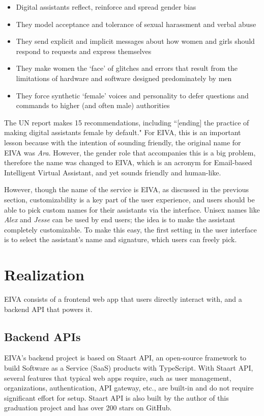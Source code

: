 \documentclass{article}
\begin{document}
\begin{itemize}
	\item Digital assistants reflect, reinforce and spread gender bias
	\item They model acceptance and tolerance of sexual harassment and verbal abuse
	\item They send explicit and implicit messages about how women and girls should respond to requests and express themselves
	\item They make women the ‘face’ of glitches and errors that result from the limitations of hardware and software designed predominately by men
	\item They force synthetic ‘female’ voices and personality to defer questions and commands to higher (and often male) authorities
\end{itemize}

The UN report makes 15 recommendations, including ``[ending] the practice of making digital assistants female by default." For EIVA, this is an important lesson because with the intention of sounding friendly, the original name for EIVA was \emph{Ara}. However, the gender role that accompanies this is a big problem, therefore the name was changed to EIVA, which is an acronym for Email-based Intelligent Virtual Assistant, and yet sounds friendly and human-like.

However, though the name of the service is EIVA, as discussed in the previous section, customizability is a key part of the user experience, and users should be able to pick custom names for their assistants via the interface. Unisex names like \emph{Alex} and \emph{Jesse} can be used by end users; the idea is to make the assistant completely customizable. To make this easy, the first setting in the user interface is to select the assistant's name and signature, which users can freely pick.

\newpage

\section{Realization}

EIVA consists of a frontend web app that users directly interact with, and a backend API that powers it.

\subsection{Backend APIs}

EIVA's backend project is based on Staart API, an open-source framework to build Software as a Service (SaaS) products with TypeScript. With Staart API, several features that typical web apps require, such as user management, organizations, authentication, API gateway, etc., are built-in and do not require significant effort for setup. Staart API is also built by the author of this graduation project and has over 200 stars on GitHub.
\end{document}
